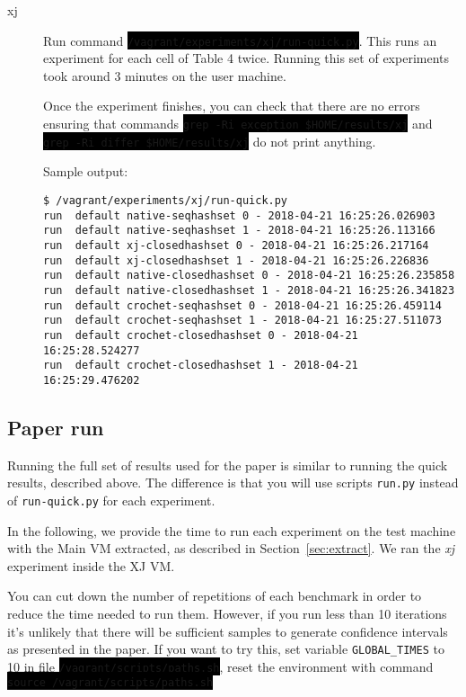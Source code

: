 \documentclass[12pt]{article}
\newcommand{\command}[1]{\colorbox{black}{\texttt{\color{white}#1}}}
\begin{document}
\begin{description}

    \item[xj] Run command \command{/vagrant/experiments/xj/run-quick.py}.  This
        runs an experiment for each cell of Table 4 twice.  Running this set of
        experiments took around 3 minutes on the user machine.

        Once the experiment finishes, you can check that there are no errors
        ensuring that commands \command{grep -Ri exception \$HOME/results/xj} and
        \command{grep -Ri differ \$HOME/results/xj} do not print anything.

Sample output:
\begin{verbatim}
$ /vagrant/experiments/xj/run-quick.py
run  default native-seqhashset 0 - 2018-04-21 16:25:26.026903
run  default native-seqhashset 1 - 2018-04-21 16:25:26.113166
run  default xj-closedhashset 0 - 2018-04-21 16:25:26.217164
run  default xj-closedhashset 1 - 2018-04-21 16:25:26.226836
run  default native-closedhashset 0 - 2018-04-21 16:25:26.235858
run  default native-closedhashset 1 - 2018-04-21 16:25:26.341823
run  default crochet-seqhashset 0 - 2018-04-21 16:25:26.459114
run  default crochet-seqhashset 1 - 2018-04-21 16:25:27.511073
run  default crochet-closedhashset 0 - 2018-04-21 16:25:28.524277
run  default crochet-closedhashset 1 - 2018-04-21 16:25:29.476202
\end{verbatim}

\end{description}

\subsection{Paper run}
\label{sec:paper-run}

Running the full set of results used for the paper is similar to running the
quick results, described above.  The difference is that you will use scripts
\texttt{run.py} instead of \texttt{run-quick.py} for each experiment.

In the following, we provide the time to run each experiment on the
test machine with the Main VM extracted, as described in
Section~\ref{sec:extract}.  We ran the \emph{xj} experiment inside the XJ VM.

You can cut down the number of repetitions of each benchmark in order to reduce the time needed to run them. However, if you run less than 10 iterations it's unlikely that there will be sufficient samples to generate confidence intervals as presented in the paper. If you want to try this, set variable \texttt{GLOBAL\_TIMES} to
        10 in file \command{/vagrant/scripts/paths.sh}, reset the environment with
        command \command{source /vagrant/scripts/paths.sh} 
\end{document}
